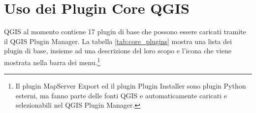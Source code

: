 
\section{Uso dei Plugin Core QGIS}\label{sec:core_plugins}


QGIS al momento contiene 17 plugin di base che possono essere caricati tramite
il QGIS Plugin Manager.
La tabella \ref{tab:core_plugins} mostra una lista dei plugin di base, insieme
ad una descrizione del loro scopo e l'icona che viene mostrata nella barra dei
menu.\footnote{Il plugin MapServer Export ed il plugin Plugin Installer sono plugin Python esterni,
ma fanno parte delle fonti QGIS e automaticamente caricati e selezionabili nel QGIS Plugin Manager.}

